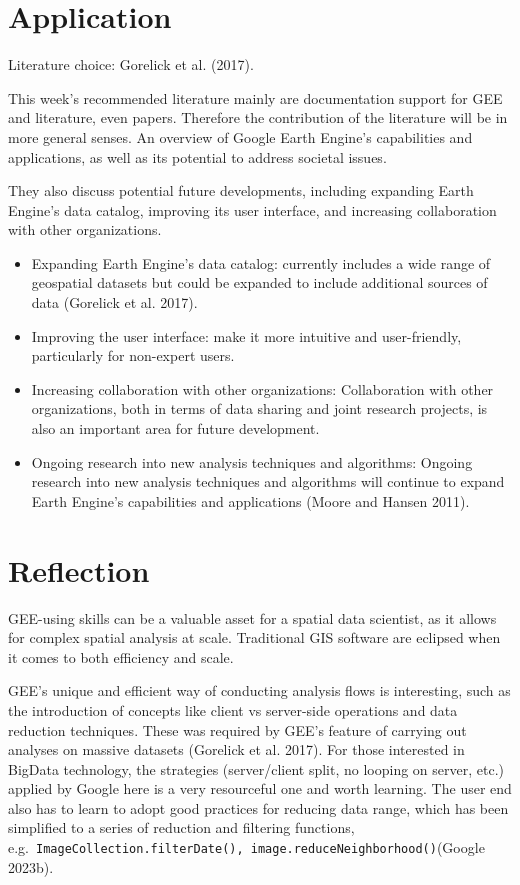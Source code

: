 \documentclass[
  letterpaper,
  DIV=11,
  numbers=noendperiod]{scrreprt}
\providecommand{\tightlist}{%
  \setlength{\itemsep}{0pt}\setlength{\parskip}{0pt}}\usepackage{longtable,booktabs,array}
\begin{document}
\hypertarget{application-2}{%
\section{Application}\label{application-2}}

Literature choice: Gorelick et al. (2017).

This week's recommended literature mainly are documentation support for
GEE and literature, even papers. Therefore the contribution of the
literature will be in more general senses. An overview of Google Earth
Engine's capabilities and applications, as well as its potential to
address societal issues.

They also discuss potential future developments, including expanding
Earth Engine's data catalog, improving its user interface, and
increasing collaboration with other organizations.

\begin{itemize}
\tightlist
\item
  Expanding Earth Engine's data catalog: currently includes a wide range
  of geospatial datasets but could be expanded to include additional
  sources of data (Gorelick et al. 2017).
\item
  Improving the user interface: make it more intuitive and
  user-friendly, particularly for non-expert users.
\item
  Increasing collaboration with other organizations: Collaboration with
  other organizations, both in terms of data sharing and joint research
  projects, is also an important area for future development.
\item
  Ongoing research into new analysis techniques and algorithms: Ongoing
  research into new analysis techniques and algorithms will continue to
  expand Earth Engine's capabilities and applications (Moore and Hansen
  2011).
\end{itemize}

\hypertarget{reflection-3}{%
\section{Reflection}\label{reflection-3}}

GEE-using skills can be a valuable asset for a spatial data scientist,
as it allows for complex spatial analysis at scale. Traditional GIS
software are eclipsed when it comes to both efficiency and scale.

GEE's unique and efficient way of conducting analysis flows is
interesting, such as the introduction of concepts like client vs
server-side operations and data reduction techniques. These was required
by GEE's feature of carrying out analyses on massive datasets (Gorelick
et al. 2017). For those interested in BigData technology, the strategies
(server/client split, no looping on server, etc.) applied by Google here
is a very resourceful one and worth learning. The user end also has to
learn to adopt good practices for reducing data range, which has been
simplified to a series of reduction and filtering functions,
e.g.~\texttt{ImageCollection.filterDate(),\ image.reduceNeighborhood()}(Google
2023b).
\end{document}

